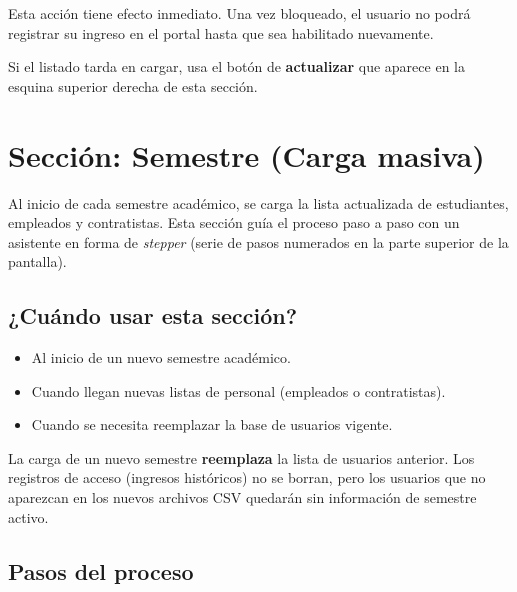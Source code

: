 \documentclass[12pt, a4paper]{article}
\begin{document}
\begin{aviso}
  Esta acción tiene efecto inmediato. Una vez bloqueado, el usuario
  no podrá registrar su ingreso en el portal hasta que sea habilitado
  nuevamente.
\end{aviso}

\begin{tip}
  Si el listado tarda en cargar, usa el botón de \textbf{actualizar}
  que aparece en la esquina superior derecha de esta sección.
\end{tip}

\section{Sección: Semestre (Carga masiva)}
\label{sec:semestre}

Al inicio de cada semestre académico, se carga la lista actualizada
de estudiantes, empleados y contratistas. Esta sección guía el proceso
paso a paso con un asistente en forma de \emph{stepper} (serie de pasos
numerados en la parte superior de la pantalla).

\subsection{¿Cuándo usar esta sección?}

\begin{itemize}
  \item Al inicio de un nuevo semestre académico.
  \item Cuando llegan nuevas listas de personal (empleados o contratistas).
  \item Cuando se necesita reemplazar la base de usuarios vigente.
\end{itemize}

\begin{peligro}
  La carga de un nuevo semestre \textbf{reemplaza} la lista de usuarios
  anterior. Los registros de acceso (ingresos históricos) no se borran,
  pero los usuarios que no aparezcan en los nuevos archivos CSV
  quedarán sin información de semestre activo.
\end{peligro}

\subsection{Pasos del proceso}
\end{document}
